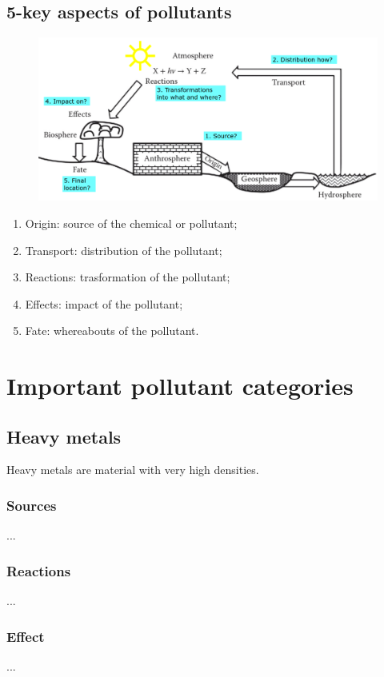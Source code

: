 \documentclass{article}
\newcommand{\cfig}[1]{%
  \begin{figure}[ht!]%
    \centering%
    #1%
  \end{figure}%
}
\begin{document}
\subsection{5-key aspects of pollutants}
\cfig{\includegraphics*[width=\textwidth]{media/pollutant aspects.png}}

\begin{enumerate}
    \item Origin: source of the chemical or pollutant;
    \item Transport: distribution of the pollutant;
    \item Reactions: trasformation of the pollutant;
    \item Effects: impact of the pollutant;
    \item Fate: whereabouts of the pollutant.
\end{enumerate}

\section{Important pollutant categories}
\subsection{Heavy metals}
Heavy metals are material with very high densities.

\subsubsection{Sources}
...

\subsubsection{Reactions}
...

\subsubsection{Effect}
...
\end{document}
